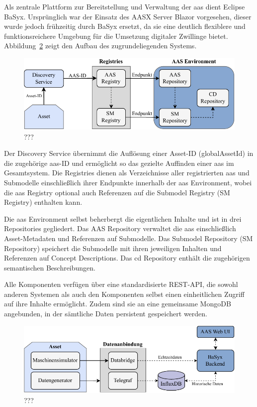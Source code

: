 Als zentrale Plattform zur Bereitstellung und Verwaltung der \acs{aas} dient Eclipse BaSyx.
Ursprünglich war der Einsatz des AASX Server Blazor vorgesehen, dieser wurde jedoch frühzeitig durch BaSyx ersetzt, da sie eine deutlich flexiblere und funktionsreichere Umgebung für die Umsetzung digitaler Zwillinge bietet.
Abbildung~\ref{fig:BaSyxArchitektur} zeigt den Aufbau des zugrundeliegenden Systems.

\begin{figure}[htbp]
    \centering
        \includegraphics[width=1\textwidth]{Bilder/Ergebnisse/Systemarchitektur/BaSyx.pdf}
    \caption{???}
    \label{fig:BaSyxArchitektur}
\end{figure}

Der Discovery Service übernimmt die Auflösung einer Asset-ID (globalAssetId) in die zugehörige \acs{aas}-ID und ermöglicht so das gezielte Auffinden einer \acs{aas} im Gesamtsystem. 
Die Registries dienen als Verzeichnisse aller registrierten \acs{aas} und Submodelle einschließlich ihrer Endpunkte innerhalb der \acs{aas} Environment, wobei die \acs{aas} Registry optional auch Referenzen auf die Submodel Registry (SM Registry) enthalten kann. 

Die \acs{aas} Environment selbst beherbergt die eigentlichen Inhalte und ist in drei Repositories gegliedert. 
Das AAS Repository verwaltet die \acs{aas} einschließlich Asset-Metadaten und Referenzen auf Submodelle. 
Das Submodel Repository (SM Repository) speichert die Submodelle mit ihren jeweiligen Inhalten und Referenzen auf Concept Descriptions. 
Das \acs{cd} Repository enthält die zugehörigen semantischen Beschreibungen. 

Alle Komponenten verfügen über eine standardisierte REST-API, die sowohl anderen Systemen als auch den Komponenten selbst einen einheitlichen Zugriff auf ihre Inhalte ermöglicht. 
Zudem sind sie an eine gemeinsame MongoDB angebunden, in der sämtliche Daten persistent gespeichert werden.

\begin{figure}[htbp]
    \centering
        \includegraphics[width=1\textwidth]{Bilder/Ergebnisse/Systemarchitektur/DynamischeErwweiterung.pdf}
    \caption{???}
    \label{fig:BaSyxArchitektur}
\end{figure}

